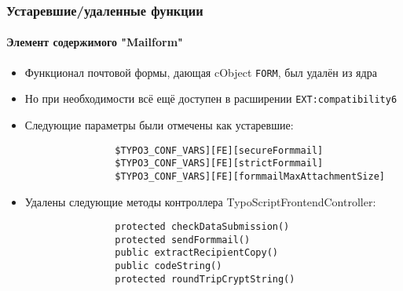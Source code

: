 
\begin{frame}[fragile]
	\frametitle{Устаревшие/удаленные функции}
	\framesubtitle{Элемент содержимого "Mailform"}

	\begin{itemize}

		\item Функционал почтовой формы, дающая cObject \texttt{FORM}, был
			удалён из ядра

		\item Но при необходимости всё ещё доступен в расширении \texttt{EXT:compatibility6}

		\item Следующие параметры были отмечены как устаревшие:

			\begin{lstlisting}
				$TYPO3_CONF_VARS][FE][secureFormmail]
				$TYPO3_CONF_VARS][FE][strictFormmail]
				$TYPO3_CONF_VARS][FE][formmailMaxAttachmentSize]
			\end{lstlisting}

		\item Удалены следующие методы контроллера TypoScriptFrontendController:

			\begin{lstlisting}
				protected checkDataSubmission()
				protected sendFormmail()
				public extractRecipientCopy()
				public codeString()
				protected roundTripCryptString()
			\end{lstlisting}

	\end{itemize}

\end{frame}


